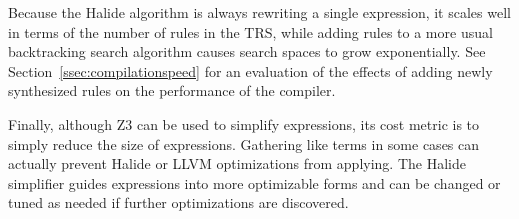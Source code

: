 \documentclass[sigplan,10pt,review,anonymous]{acmart}\settopmatter{printfolios=true,printccs=false,printacmref=false}
\begin{document}
Because the Halide algorithm is always rewriting a single expression, it scales well in terms of the number of rules in the TRS, while adding rules to a more usual backtracking search algorithm causes search spaces to grow exponentially. See Section~\ref{ssec:compilationspeed} for an evaluation of the effects of adding newly synthesized rules on the performance of the compiler. 

Finally, although Z3 can be used to simplify expressions, its cost metric is to simply reduce the size of expressions. Gathering like terms in some cases can actually prevent Halide or LLVM optimizations from applying. The Halide simplifier guides expressions into more optimizable forms and can be changed or tuned as needed if further optimizations are discovered. 







\end{document}
